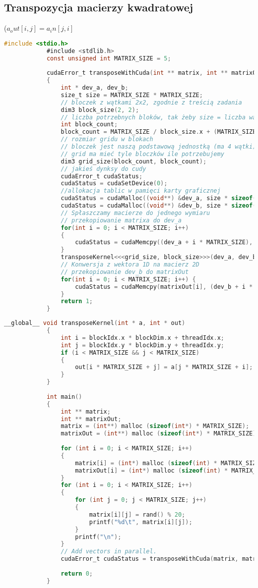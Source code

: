 		\subsection{Transpozycja macierzy kwadratowej}
			($ a_out[ i,j ] = a_in [ j,i ] $
			\begin{lstlisting}[language=C]
			#include <stdio.h>
			#include <stdlib.h>
			const unsigned int MATRIX_SIZE = 5;
			
			cudaError_t transposeWithCuda(int ** matrix, int ** matrixOut)
			{
				int * dev_a, dev_b;
				size_t size = MATRIX_SIZE * MATRIX_SIZE;
				// bloczek z wątkami 2x2, zgodnie z treścią zadania
				dim3 block_size(2, 2);
				// liczba potrzebnych bloków, tak żeby size = liczba wątków
				int block_count;
				block_count = MATRIX_SIZE / block_size.x + (MATRIX_SIZE % block_size.x == 0 ? 0 : 1);
				// rozmiar gridu w blokach
				// bloczek jest naszą podstawową jednostką (ma 4 wątki)
				// grid ma mieć tyle bloczków ile potrzebujemy
				dim3 grid_size(block_count, block_count);
				// jakieś dynksy do cudy
				cudaError_t cudaStatus;
				cudaStatus = cudaSetDevice(0);
				//allokacja tablic w pamięci karty graficznej
				cudaStatus = cudaMalloc((void**) &dev_a, size * sizeof(int));
				cudaStatus = cudaMalloc((void**) &dev_b, size * sizeof(int));
				// Spłaszczamy macierze do jednego wymiaru
				// przekopiowanie matrixa do dev_a
				for(int i = 0; i < MATRIX_SIZE; i++)
				{
					cudaStatus = cudaMemcpy((dev_a + i * MATRIX_SIZE), matrix[i], MATRIX_SIZE * sizeof(int), cudaMemcpyHostToDevice);
				}
				transposeKernel<<<grid_size, block_size>>>(dev_a, dev_b);
				// Konwersja z wektora 1D na macierz 2D
				// przekopiowanie dev_b do matrixOut
				for(int i = 0; i < MATRIX_SIZE; i++) {
					cudaStatus = cudaMemcpy(matrixOut[i], (dev_b + i * MATRIX_SIZE), MATRIX_SIZE * sizeof(int), cudaMemcpyDeviceToHost);
				}
				return 1;
			}
			\end{lstlisting}
			\newpage
			\begin{lstlisting}[language=C]
			__global__ void transposeKernel(int * a, int * out)
			{
				int i = blockIdx.x * blockDim.x + threadIdx.x;
				int j = blockIdx.y * blockDim.y + threadIdx.y;
				if (i < MATRIX_SIZE && j < MATRIX_SIZE)
				{
					out[i * MATRIX_SIZE + j] = a[j * MATRIX_SIZE + i];
				}
			}
			
			int main()
			{
				int ** matrix;
				int ** matrixOut;
				matrix = (int**) malloc (sizeof(int*) * MATRIX_SIZE);
				matrixOut = (int**) malloc (sizeof(int*) * MATRIX_SIZE);
				
				for (int i = 0; i < MATRIX_SIZE; i++)
				{
					matrix[i] = (int*) malloc (sizeof(int) * MATRIX_SIZE);
					matrixOut[i] = (int*) malloc (sizeof(int) * MATRIX_SIZE);
				}
				for (int i = 0; i < MATRIX_SIZE; i++)
				{
					for (int j = 0; j < MATRIX_SIZE; j++)
					{
						matrix[i][j] = rand() % 20;
						printf("%d\t", matrix[i][j]);
					}
					printf("\n");
				}
				// Add vectors in parallel.
				cudaError_t cudaStatus = transposeWithCuda(matrix, matrixOut);
				
				return 0;
			}
			
			\end{lstlisting}